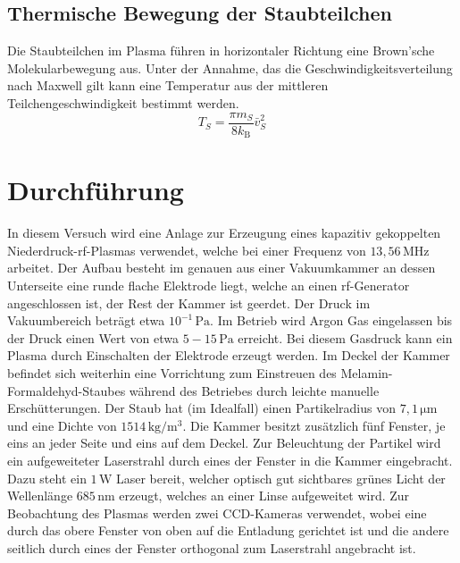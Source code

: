 \documentclass[numbers=noenddot,a4paper,notitlepage,twoside,BCOR15mm]{scrartcl}
\begin{document}
		\subsection{Thermische Bewegung der Staubteilchen}
		
		Die Staubteilchen im Plasma führen in horizontaler Richtung eine Brown'sche Molekularbewegung aus. Unter der Annahme, das die Geschwindigkeitsverteilung nach Maxwell gilt kann eine Temperatur aus der mittleren Teilchengeschwindigkeit bestimmt werden.
		\begin{equation}
			T_S = \frac{ \pi m_S }{8 k_\mathrm{B}}\bar{v}^2_S
		\end{equation}
		
	\newpage
	\section{Durchführung}

	In diesem Versuch wird eine Anlage zur Erzeugung eines kapazitiv gekoppelten Niederdruck-rf-Plasmas verwendet, welche bei einer Frequenz von $13,56\,\mathrm{MHz}$ arbeitet. Der Aufbau besteht im genauen aus einer Vakuumkammer an dessen Unterseite eine runde flache Elektrode liegt, welche an einen rf-Generator angeschlossen ist, der Rest der Kammer ist geerdet. Der Druck im Vakuumbereich beträgt etwa $10^{-1}\,\mathrm{Pa}$. Im Betrieb wird Argon Gas eingelassen bis der Druck einen Wert von etwa $5-15\,\mathrm{Pa}$ erreicht. Bei diesem Gasdruck kann ein Plasma durch Einschalten der Elektrode erzeugt werden. Im Deckel der Kammer befindet sich weiterhin eine Vorrichtung zum Einstreuen des Melamin-Formaldehyd-Staubes während des Betriebes durch leichte manuelle Erschütterungen. Der Staub hat (im Idealfall) einen Partikelradius von $7,1\,\mathrm{\mu m}$ und eine Dichte von $1514\,\mathrm{kg/m^3}$. Die Kammer besitzt zusätzlich fünf Fenster, je eins an jeder Seite und eins auf dem Deckel. Zur Beleuchtung der Partikel wird ein aufgeweiteter Laserstrahl durch eines der Fenster in die Kammer eingebracht. Dazu steht ein $1\,\mathrm{W}$ Laser bereit, welcher optisch gut sichtbares grünes Licht der Wellenlänge $685\,\mathrm{nm}$ erzeugt, welches an einer Linse aufgeweitet wird. Zur Beobachtung des Plasmas werden zwei CCD-Kameras verwendet, wobei eine durch das obere Fenster von oben auf die Entladung gerichtet ist und die andere seitlich durch eines der Fenster orthogonal zum Laserstrahl angebracht ist.\\
	
\end{document}
